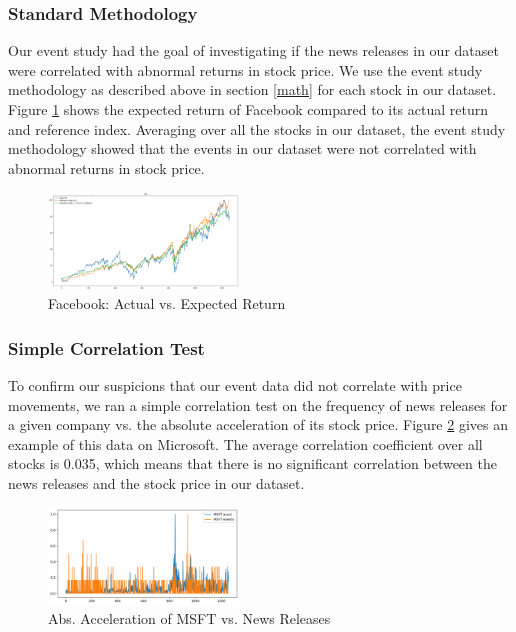 \documentclass[conference]{IEEEtran}
\begin{document}
\subsubsection{Standard Methodology}
Our event study had the goal of investigating if the news releases in our dataset were correlated with abnormal returns in stock price. We use the event study methodology as described above in section \ref{math} for each stock in our dataset. Figure \ref{fig:expected} shows the expected return of Facebook compared to its actual return and reference index. Averaging over all the stocks in our dataset, the event study methodology showed that the events in our dataset were not correlated with abnormal returns in stock price.
\begin{figure}[ht]
    \centering
    \includegraphics[width=0.45\textwidth]{FBExpectedValues.png}
    \caption{Facebook: Actual vs. Expected Return}
    \label{fig:expected}
\end{figure} 
\subsubsection{Simple Correlation Test}
To confirm our suspicions that our event data did not correlate with price movements, we ran a simple correlation test on the frequency of news releases for a given company vs. the absolute acceleration of its stock price. Figure \ref{fig:acceleartion} gives an example of this data on Microsoft. The average correlation coefficient over all stocks is 0.035, which means that there is no significant correlation between the news releases and the stock price in our dataset.
\begin{figure}[ht]
    \centering
    \includegraphics[width=0.45\textwidth]{MSFTevents.png}
    \caption{Abs. Acceleration of MSFT vs. News Releases}
    \label{fig:acceleartion}
\end{figure}
\end{document}
